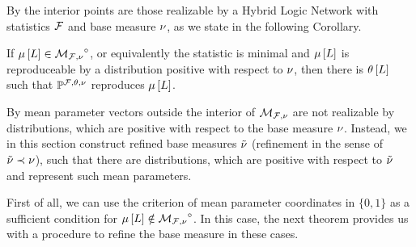 
By  the interior points are those realizable by a Hybrid Logic Network with statistics $\mathcal{F}$ and base measure $\nu$, as we state in the following Corollary.

\begin{corollary}\label{cor:interiorCharacterizationHLN}
	If $\mu\left[L\right]\in{\mathcal{M}_{\mathcal{F},\nu}}^{\circ}$, or equivalently the statistic is minimal and $\mu\left[L\right]$ is reproduceable by a distribution positive with respect to $\nu$, then there is $\theta\left[L\right]$ such that $\mathbb{P}^{\mathcal{F},\theta,\nu}$ reproduces $\mu\left[L\right]$.
\end{corollary}


By  mean parameter vectors outside the interior of $\mathcal{M}_{\mathcal{F},\nu}$ are not realizable by distributions, which are positive with respect to the base measure $\nu$.
Instead, we in this section construct refined base measures $\tilde{\nu}$ (refinement in the sense of $\tilde{\nu}\prec\nu$), such that there are distributions, which are positive with respect to $\tilde{\nu}$ and represent such mean parameters.


First of all, we can use the criterion of mean parameter coordinates in $\{0,1\}$ as a sufficient condition for $\mu\left[L\right]\notin{\mathcal{M}_{\mathcal{F},\nu}}^{\circ}$.
In this case, the next theorem provides us with a procedure to refine the base measure in these cases.

